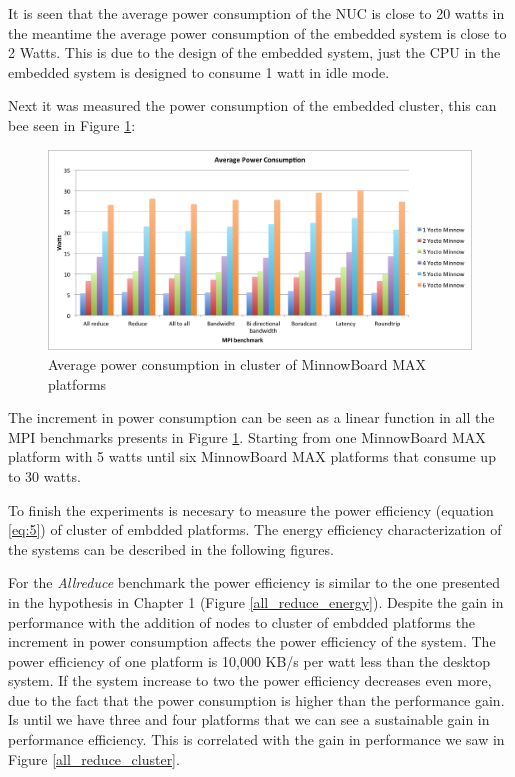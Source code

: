 It is seen that the average power consumption of the NUC is close to 20 watts in
the meantime the average power consumption of the embedded system is close to
2 Watts. This is due to the design of the embedded system, just the CPU in the
embedded system is designed to consume 1 watt in idle mode.

Next it was measured the power consumption of the embedded cluster,
this can bee seen in Figure \ref{power_average_minnow}: 

\begin{figure}[H]
\centering
\includegraphics[width=1 \textwidth]{images/power_average.png}
\caption{Average power consumption in cluster of MinnowBoard MAX platforms}
\label{power_average_minnow}
\end{figure}

The increment in power consumption can be seen as a linear function in all the
MPI benchmarks presents in Figure \ref {power_average_minnow}. Starting from
one MinnowBoard MAX platform with 5 watts until six MinnowBoard MAX platforms
that consume up to 30 watts. 

To finish the experiments is necesary to measure the power efficiency 
(equation \ref{eq:5}) of cluster of embdded platforms. The energy efficiency 
characterization of the systems can be described in the
following figures.

For the \textit{Allreduce} benchmark the power efficiency is similar to the one
presented in the hypothesis in Chapter 1 (Figure \ref{all_reduce_energy}).
Despite the gain in performance with the addition of nodes to cluster of embdded
platforms the increment in power consumption affects the power efficiency of the
system.  The power efficiency of one platform is 10,000 KB/s per watt less than
the desktop system. If the system increase to two the power efficiency
decreases even more, due to the fact that the power consumption is higher than the
performance gain.  Is until we have three and four platforms that we can see a
sustainable gain in performance efficiency. This is correlated with the gain in
performance we saw in Figure \ref{all_reduce_cluster}. 


